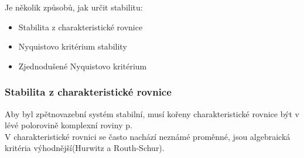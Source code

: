 Je několik způsobů, jak určit stabilitu:
\begin{itemize}
    \item Stabilita z charakteristické rovnice
    \item Nyquistovo kritérium stability
    \item Zjednodušené Nyquistovo kritérium
\end{itemize}


\subsubsection*{Stabilita z charakteristické rovnice}
Aby byl zpětnovazební systém stabilní, musí kořeny charakteristické rovnice být v lévé polorovině komplexní roviny p.\\
V charakteristické rovnici se často nachází neznámé proměnné, jsou algebraická kritéria výhodnější(Hurwitz a Routh-Schur).\\

